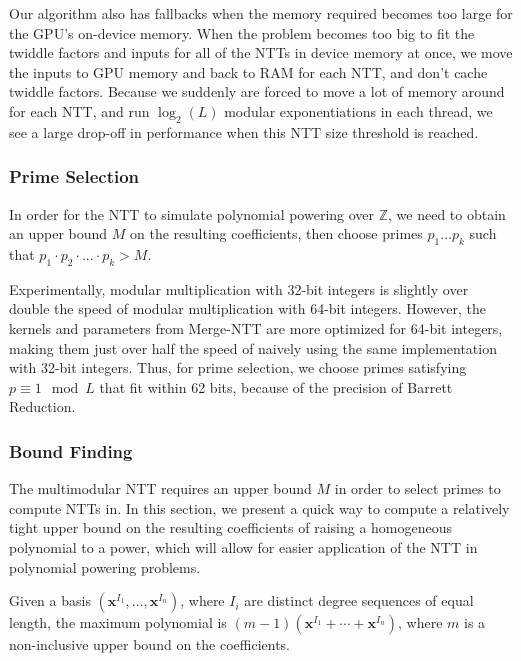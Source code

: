 Our algorithm also has fallbacks when the memory required becomes too large for the 
GPU's on-device memory.
When the problem becomes too big to fit the twiddle factors and 
inputs for all of the NTTs in device memory at once, 
we move the inputs to GPU memory and 
back to RAM for each NTT, and don't cache
twiddle factors. Because we suddenly are forced to move a lot 
of memory around for each NTT, and run $\log_2(L)$ modular 
exponentiations in each thread,
we see a large drop-off in 
performance when this NTT size threshold is reached. 


\subsubsection{Prime Selection}
In order for the NTT to simulate polynomial powering over $\mathbb{Z}$, 
we need to obtain an upper bound $M$ 
on the resulting coefficients, then 
choose primes $p_1 \dots p_k$ such 
that $p_1 \cdot p_2 \cdot ... \cdot p_k > M$.

Experimentally, modular multiplication with 32-bit integers 
is slightly over double the speed of modular 
multiplication with 64-bit integers. 
However, the kernels and parameters from Merge-NTT are more 
optimized for 64-bit integers, making them just over half the
speed of naively using the same implementation with 32-bit 
integers. Thus, for prime selection, 
we choose primes satisfying $p \equiv 1 \mod L$ that fit 
within 62 bits, because of the precision of Barrett Reduction.

\subsubsection{Bound Finding}
The multimodular NTT requires an upper bound $M$ in order to select primes 
to compute NTTs in. In this section, we present a quick way to compute a 
relatively tight upper bound on the resulting 
coefficients of raising a homogeneous polynomial to a power, which
will allow for easier application of the NTT in polynomial powering
problems.

\begin{defn}
    Given a basis $(\mathbf{x}^{I_1}, \dots, \mathbf{x}^{I_n})$, where $I_i$ are distinct degree sequences of equal length, the maximum polynomial is $(m - 1)(\mathbf{x}^{I_1} + \cdots + \mathbf{x}^{I_n})$, where $m$ is a non-inclusive upper bound on the coefficients.
\end{defn}

